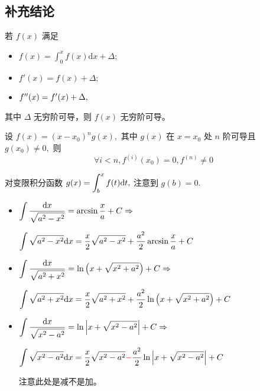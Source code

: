 \begin{Appendices}[附录]

\chapter{补充结论}


若 $ f(x) $ 满足
\begin{itemize}
    \item $ f(x)=\int_0^xf(x)\mathrm{d}x + \Delta; $ 
    \item $ f'(x)=f(x)+\Delta; $ 
    \item $ f^{\prime\prime}(x) = f'(x) + \Delta,$ 
\end{itemize}

其中 $ \Delta $ 无穷阶可导，则 $ f(x) $ 无穷阶可导。


设 $ f(x) = (x - x_0)^ng(x), $ 其中 $ g(x) $ 在 $ x = x_0 $ 处 $ n $ 阶可导且 $ g(x_0) \neq 0, $ 则
$$
    \forall  i < n, f^{(i)}(x_0) = 0, f^{(n)}\neq 0
$$  


对变限积分函数 $ g(x) = \displaystyle \int_b^x f(t)\mathrm{d}t, $ 注意到 $ g(b) = 0. $ 


\begin{itemize}
    \item $ \displaystyle \int \dfrac{\mathrm{d}x}{\displaystyle\sqrt{a^2 - x^2}} =  \arcsin \dfrac{x}{a} + C \Rightarrow $
    
    $ \displaystyle \int \displaystyle\sqrt{a^2 - x^2} \mathrm{d}x = \dfrac{x}{2}\displaystyle\sqrt{a^2 - x^2} + \dfrac{a^2}{2}\arcsin \dfrac{x}{a} + C $ 
    \item $ \displaystyle \int \dfrac{\mathrm{d}x}{\displaystyle\sqrt{a^2 + x^2}} =  \ln\left(x + \displaystyle\sqrt{x^2+a^2}\right) + C \Rightarrow $
    
    $ \displaystyle \int \displaystyle\sqrt{a^2 + x^2} \mathrm{d}x = \dfrac{x}{2}\displaystyle\sqrt{a^2 + x^2} + 
    \dfrac{a^2}{2}\ln\left(x + \displaystyle\sqrt{x^2+a^2}\right) + C $ 
    \item $ \displaystyle \int \dfrac{\mathrm{d}x}{\displaystyle\sqrt{x^2 - a^2}} = \ln\left|x + \displaystyle\sqrt{x^2 - a^2}\right| + C \Rightarrow $
    
    $ \displaystyle \int \displaystyle\sqrt{x^2 - a^2} \mathrm{d}x = \dfrac{x}{2}\displaystyle\sqrt{x^2 - a^2} \textcolor{red}{\bf{-}} 
    \dfrac{a^2}{2}\ln\left|x + \displaystyle\sqrt{x^2 - a^2}\right| + C $ 

    注意此处是减不是加。
\end{itemize}



\end{Appendices}
